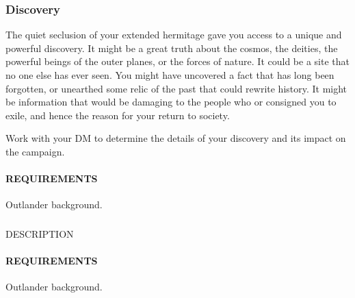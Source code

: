     \subsubsection{Discovery} \label{feat::discovery} %
        The quiet seclusion of your extended hermitage gave you access to a unique and powerful discovery.
        It might be a great truth about the cosmos, the deities, the powerful beings of the outer planes, or the forces of nature.
        It could be a site that no one else has ever seen.
        You might have uncovered a fact that has long been forgotten, or unearthed some relic of the past that could rewrite history.
        It might be information that would be damaging to the people who or consigned you to exile, and hence the reason for your return to society.

        Work with your DM to determine the details of your discovery and its impact on the campaign.
        \paragraph{REQUIREMENTS} Outlander background.

    \subsubsection{} \label{feat::NAME}
        DESCRIPTION
        \paragraph{REQUIREMENTS} Outlander background.



